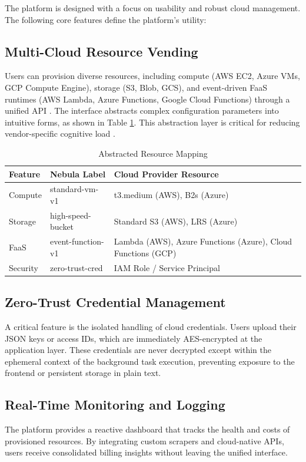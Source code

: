 The platform is designed with a focus on usability and robust cloud management. The following core features define the platform's utility:

\subsection{Multi-Cloud Resource Vending}
Users can provision diverse resources, including compute (AWS EC2, Azure VMs, GCP Compute Engine), storage (S3, Blob, GCS), and event-driven FaaS runtimes (AWS Lambda, Azure Functions, Google Cloud Functions) through a unified API \cite{aws_lambda_docs_2026, azure_functions_docs_2026, gcp_cloud_functions_docs_2026}. The interface abstracts complex configuration parameters into intuitive forms, as shown in Table \ref{tab:mapping}. This abstraction layer is critical for reducing vendor-specific cognitive load \cite{brikman2019terraform}.

\begin{table}[h]
\centering
\caption{Abstracted Resource Mapping}
\label{tab:mapping}
\begin{tabular}{|l|l|l|}
\hline
\textbf{Feature} & \textbf{Nebula Label} & \textbf{Cloud Provider Resource} \\ \hline
Compute & standard-vm-v1 & t3.medium (AWS), B2s (Azure) \\ \hline
Storage & high-speed-bucket & Standard S3 (AWS), LRS (Azure) \\ \hline
FaaS & event-function-v1 & Lambda (AWS), Azure Functions (Azure), Cloud Functions (GCP) \\ \hline
Security & zero-trust-cred & IAM Role / Service Principal \\ \hline
\end{tabular}
\end{table}

\subsection{Zero-Trust Credential Management}
A critical feature is the isolated handling of cloud credentials. Users upload their JSON keys or access IDs, which are immediately AES-encrypted at the application layer. These credentials are never decrypted except within the ephemeral context of the background task execution, preventing exposure to the frontend or persistent storage in plain text.

\subsection{Real-Time Monitoring and Logging}
The platform provides a reactive dashboard that tracks the health and costs of provisioned resources. By integrating custom scrapers and cloud-native APIs, users receive consolidated billing insights without leaving the unified interface.
